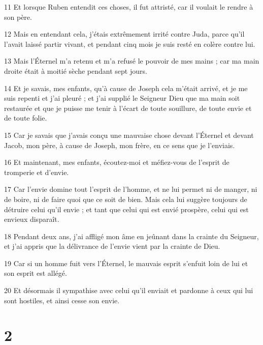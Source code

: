\par 11 Et lorsque Ruben entendit ces choses, il fut attristé, car il voulait le rendre à son père.

\par 12 Mais en entendant cela, j'étais extrêmement irrité contre Juda, parce qu'il l'avait laissé partir vivant, et pendant cinq mois je suis resté en colère contre lui.

\par 13 Mais l'Éternel m'a retenu et m'a refusé le pouvoir de mes mains ; car ma main droite était à moitié sèche pendant sept jours.

\par 14 Et je savais, mes enfants, qu'à cause de Joseph cela m'était arrivé, et je me suis repenti et j'ai pleuré ; et j'ai supplié le Seigneur Dieu que ma main soit restaurée et que je puisse me tenir à l'écart de toute souillure, de toute envie et de toute folie.

\par 15 Car je savais que j'avais conçu une mauvaise chose devant l'Éternel et devant Jacob, mon père, à cause de Joseph, mon frère, en ce sens que je l'enviais.

\par 16 Et maintenant, mes enfants, écoutez-moi et méfiez-vous de l'esprit de tromperie et d'envie.

\par 17 Car l'envie domine tout l'esprit de l'homme, et ne lui permet ni de manger, ni de boire, ni de faire quoi que ce soit de bien. Mais cela lui suggère toujours de détruire celui qu'il envie ; et tant que celui qui est envié prospère, celui qui est envieux disparaît.

\par 18 Pendant deux ans, j'ai affligé mon âme en jeûnant dans la crainte du Seigneur, et j'ai appris que la délivrance de l'envie vient par la crainte de Dieu.

\par 19 Car si un homme fuit vers l'Éternel, le mauvais esprit s'enfuit loin de lui et son esprit est allégé.

\par 20 Et désormais il sympathise avec celui qu'il enviait et pardonne à ceux qui lui sont hostiles, et ainsi cesse son envie.



\chapter{2}

